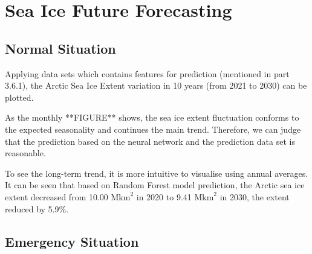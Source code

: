 \section{Sea Ice Future Forecasting} %

\subsection{Normal Situation} %

Applying data sets which contains features for prediction (mentioned in part 3.6.1), the Arctic Sea Ice Extent variation in 10 years (from 2021 to 2030) can be plotted.

As the monthly **FIGURE** shows, the sea ice extent fluctuation conforms to the expected seasonality and continues the main trend. Therefore, we can judge that the prediction based on the neural network and the prediction data set is reasonable.

To see the long-term trend, it is more intuitive to visualise using annual averages. It can be seen that based on Random Forest model prediction, the Arctic sea ice extent decreased from 10.00 $\text{Mkm}^2$ in 2020 to 9.41 $\text{Mkm}^2$ in 2030, the extent reduced by 5.9\%. 

\subsection{Emergency Situation} %
